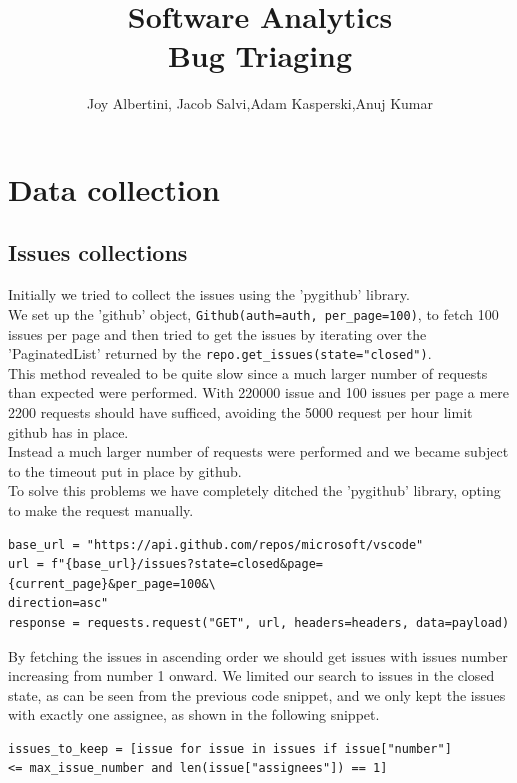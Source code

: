 \documentclass[tikz,10pt,fleqn]{article}
\title{\textbf{Software Analytics\\Bug Triaging}}
\author{Joy Albertini, Jacob Salvi,Adam Kasperski,Anuj Kumar}
\date{}
\begin{document}
\maketitle

\section*{Data collection}
\subsection*{Issues collections}
Initially we tried to collect the issues using the 'pygithub' library.\\
We set up the 'github' object, \texttt{Github(auth=auth, per_page=100)}, to fetch 100 issues per page and then tried to get the issues by iterating over the 'PaginatedList' returned by the \texttt{repo.get_issues(state="closed")}.\\
This method revealed to be quite slow since a much larger number of requests than expected were performed. With 220000 issue and 100 issues per page a mere 2200 requests should have sufficed, avoiding the 5000 request per hour limit github has in place.\\
Instead a much larger number of requests were performed and we became subject to the timeout put in place by github. \\
To solve this problems we have completely ditched the 'pygithub' library, opting to make the request manually.

\begin{verbatim}
base_url = "https://api.github.com/repos/microsoft/vscode"
url = f"{base_url}/issues?state=closed&page={current_page}&per_page=100&\
direction=asc"
response = requests.request("GET", url, headers=headers, data=payload)
\end{verbatim}

By fetching the issues in ascending order we should get issues with issues number increasing from number 1 onward. We limited our search to issues in the closed state, as can be seen from the previous code snippet, and we only kept the issues with exactly one assignee, as shown in the following snippet.\\
\begin{verbatim}
issues_to_keep = [issue for issue in issues if issue["number"] 
<= max_issue_number and len(issue["assignees"]) == 1]
\end{verbatim}
\end{document}
